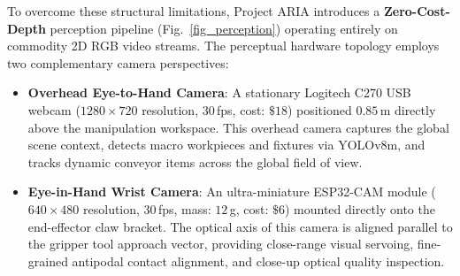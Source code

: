 \documentclass[journal]{IEEEtran}
\begin{document}
To overcome these structural limitations, Project ARIA introduces a \textbf{Zero-Cost-Depth} perception pipeline (Fig.~\ref{fig_perception}) operating entirely on commodity 2D RGB video streams. The perceptual hardware topology employs two complementary camera perspectives:
\begin{itemize}
    \item \textbf{Overhead Eye-to-Hand Camera}: A stationary Logitech C270 USB webcam ($1280\times720$ resolution, $30$\,fps, cost: $\$18$) positioned $0.85$\,m directly above the manipulation workspace. This overhead camera captures the global scene context, detects macro workpieces and fixtures via YOLOv8m, and tracks dynamic conveyor items across the global field of view.
    \item \textbf{Eye-in-Hand Wrist Camera}: An ultra-miniature ESP32-CAM module ($640\times480$ resolution, $30$\,fps, mass: $12$\,g, cost: $\$6$) mounted directly onto the end-effector claw bracket. The optical axis of this camera is aligned parallel to the gripper tool approach vector, providing close-range visual servoing, fine-grained antipodal contact alignment, and close-up optical quality inspection.
\end{itemize}
\end{document}
